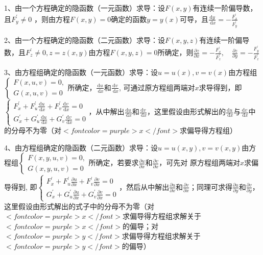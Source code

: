 1、由一个方程确定的隐函数（一元函数）求导：设$ F(x, y) $有连续一阶偏导数，且$ F_{y}^{\prime} \neq 0 $ ，则由方程$ F(x, y)=0 $确定的函数$ y=y(x) $可导，且$ \frac{\mathrm{d} y}{\mathrm{~d} x}=-\frac{F_{x}^{\prime}}{F_{y}^{\prime}} $

2、由一个方程确定的隐函数（二元函数）求导：设$ F(x, y, z) $有连续一阶偏导数，且$ F_{z}^{\prime} \neq 0, z=z(x, y) $由方程$ F(x, y, z)=0 $所确定，则$ \frac{\partial z}{\partial x}=-\frac{F_{x}^{\prime}}{F_{z}^{\prime}}, \quad \frac{\partial z}{\partial y}=-\frac{F_{y}^{\prime}}{F_{z}^{\prime}} $

3、由方程组确定的隐函数（一元函数）求导：设$ u=u(x), v=v(x) $由方程组$ \left\{\begin{array}{l}F(x, u, v)=0,  \\ G(x, u, v)=0\end{array}\right.  $所确定，$ \frac{\mathrm{d} u}{\mathrm{~d} x} $和$ \frac{\mathrm{d} v}{\mathrm{~d} x} $, 可通过原方程组两端对$ x $求导得到，即$ \left\{\begin{array}{l} F_{x}^{\prime}+F_{u}^{\prime} \frac{\mathrm{d} u}{\mathrm{~d} x}+F_{v}^{\prime} \frac{\mathrm{d} v}{\mathrm{~d} x}=0 \\ G_{x}^{\prime}+G_{u}^{\prime} \frac{\mathrm{d} u}{\mathrm{~d} x}+G_{v}^{\prime} \frac{\mathrm{d} v}{\mathrm{~d} x}=0 \end{array}\right. $，从中解出$ \frac{\mathrm{d} u}{\mathrm{~d} x} $和$ \frac{\mathrm{d} v}{\mathrm{~d} x} $，这里假设由形式解出的$ \frac{\mathrm{d} u}{\mathrm{~d} x} $与$ \frac{\mathrm{d} v}{\mathrm{~d} x} $中的分母不为零（对$ <font color=purple>x</font> $求偏导得方程组）

4、由方程组确定的隐函数（二元函数）求导：设$ u=u(x, y), v=v(x, y) $由方程组$ \left\{\begin{array}{l}F(x, y, u, v)=0, \\ G(x, y, u, v)=0\end{array}\right. $所确定，若要求$ \frac{\partial u}{\partial x} $和$ \frac{\partial v}{\partial x} $，可先对 原方程组两端对$ x $求偏导得到, 即$ \left\{\begin{array}{l} F_{x}^{\prime}+F_{u}^{\prime} \frac{\partial u}{\partial x}+F_{v}^{\prime} \frac{\partial v}{\partial x}=0 \\ G_{x}^{\prime}+G_{u}^{\prime} \frac{\partial u}{\partial x}+G_{v}^{\prime} \frac{\partial v}{\partial x}=0 \end{array}\right. $，然后从中解出$ \frac{\partial u}{\partial x} $和$ \frac{\partial v}{\partial x} $；同理可求得$ \frac{\partial u}{\partial y} $和$ \frac{\partial v}{\partial y} $，这里假设由形式解出的式子中的分母不为零（对$ <font color=purple>x</font> $求偏导得方程组求解关于$ <font color=purple>x</font> $的偏导；对$ <font color=purple>y</font> $求偏导得方程组求解关于$ <font color=purple>y</font> $的偏导）

